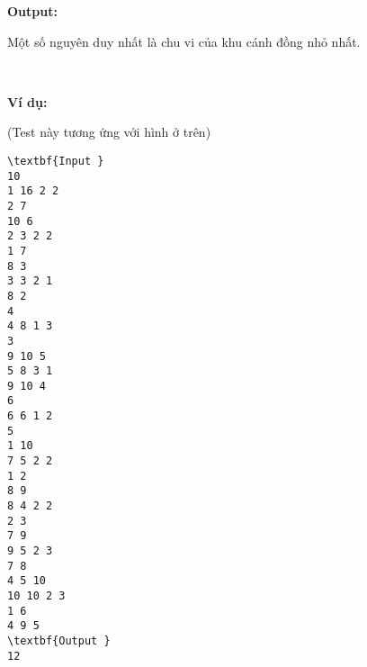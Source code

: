 \textbf{Output: }\textbf{}

Một số nguyên duy nhất là chu vi của khu cánh đồng nhỏ nhất.

 

\textbf{Ví dụ: }

(Test này tương ứng với hình ở trên) \textbf{}
\begin{verbatim}
\textbf{Input }
10
1 16 2 2
2 7
10 6
2 3 2 2
1 7
8 3
3 3 2 1
8 2
4
4 8 1 3
3
9 10 5
5 8 3 1
9 10 4
6
6 6 1 2
5
1 10
7 5 2 2
1 2
8 9
8 4 2 2
2 3
7 9
9 5 2 3
7 8
4 5 10
10 10 2 3
1 6
4 9 5
\textbf{Output }
12\end{verbatim}